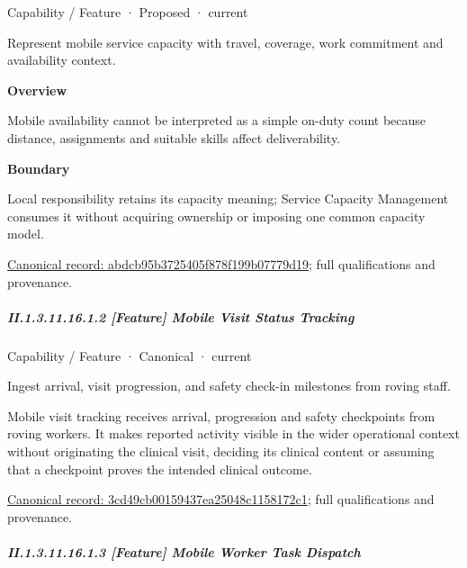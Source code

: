 \label{element:abdcb95b3725405f878f199b07779d19}
{\small Capability / Feature · Proposed · current}\par

Represent mobile service capacity with travel, coverage, work commitment and availability context.



\textbf{Overview}



Mobile availability cannot be interpreted as a simple on-duty count because distance, assignments and suitable skills affect deliverability.



\textbf{Boundary}



Local responsibility retains its capacity meaning; Service Capacity Management consumes it without acquiring ownership or imposing one common capacity model.


{\footnotesize \href{../../../../continuum/strategy/capability/feature/abdcb95b3725405f878f199b07779d19.md}{Canonical record: abdcb95b3725405f878f199b07779d19}; full qualifications and provenance.}\par
\subparagraph*{II.1.3.11.16.1.2 [Feature] Mobile Visit Status Tracking}
\label{navigation:II.1.3.11.16.1.2}

\label{element:3cd49cb00159437ea25048c1158172c1}
{\small Capability / Feature · Canonical · current}\par

Ingest arrival, visit progression, and safety check-in milestones from roving staff.



Mobile visit tracking receives arrival, progression and safety checkpoints from roving workers. It makes reported activity visible in the wider operational context without originating the clinical visit, deciding its clinical content or assuming that a checkpoint proves the intended clinical outcome.


{\footnotesize \href{../../../../continuum/strategy/capability/feature/3cd49cb00159437ea25048c1158172c1.md}{Canonical record: 3cd49cb00159437ea25048c1158172c1}; full qualifications and provenance.}\par
\subparagraph*{II.1.3.11.16.1.3 [Feature] Mobile Worker Task Dispatch}
\label{navigation:II.1.3.11.16.1.3}

